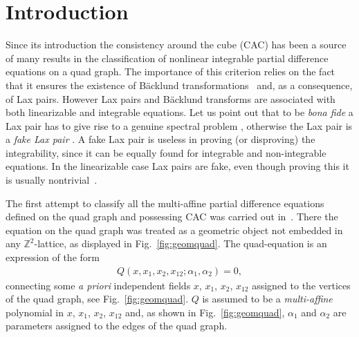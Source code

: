 \documentclass[pdftex]{sigma}
\numberwithin{equation}{section}
\newcommand{\Z}{\mathbb{Z}}
\begin{document}


\renewcommand{\thefootnote}{\arabic{footnote}}
\setcounter{footnote}{0}

\section{Introduction}

 Since its introduction the consistency around the cube (CAC) has been a source of many results in the classif\/ication of nonlinear integrable partial dif\/ference equations on a quad graph. The importance of this criterion relies on the fact that it ensures the existence of B\"acklund transformations~\cite{BobenkoSuris2002,Bridgman2013,DoliwaSantini1997,Nijhoff2002,Nijhoff2001} and, as a consequence, of Lax pairs. However \cite{Yamilov2006} Lax pairs and B\"acklund transforms are associated with both linearizable and integrable equations. Let us point out that to be \emph{bona fide} a Lax pair has to give rise to a genuine spectral problem \cite{CalogeroDeGasperisIST_I}, otherwise the Lax pair is a \emph{fake Lax pair} \cite{HayButler2013,HayButler2015, CalogeroNucci1991,Hay2009,Hay2011}. A fake Lax pair is useless in proving (or dis\-pro\-ving) the integrability, since it can be equally found for integrable and non-integrable equations. In the linearizable case Lax pairs are fake, even {though proving this it is usually nontrivial}~\cite{GSL_Gallipoli15}.

The f\/irst attempt to classify all the multi-af\/f\/ine partial dif\/ference equations def\/ined on the quad graph and possessing CAC was carried out
in~\cite{ABS2003}. There the equation on the quad graph was treated as a geometric object not embedded in any $\Z^{2}$-lattice, as displayed in Fig.~\ref{fig:geomquad}. The quad-equation is an expression of the form
\begin{gather}\label{eq:quadequa}
 Q( x,x_{1},x_{2},x_{12};\alpha_{1},\alpha_{2}) =0,
\end{gather}
connecting some \emph{a priori} independent f\/ields $x$, $x_{1}$, $x_{2}$, $x_{12}$ assigned to the vertices of the quad graph, see Fig.~\ref{fig:geomquad}.
$Q$ is assumed to be a \emph{multi-affine} polynomial in $x$, $x_{1}$, $x_{2}$, $x_{12}$ and, as shown in Fig.~\ref{fig:geomquad}, $\alpha_{1}$ and $\alpha_{2}$ are parameters assigned to the edges of the quad graph.
\end{document}
